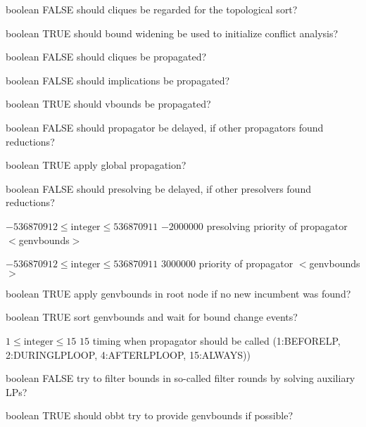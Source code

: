 %
{boolean}%
{FALSE}%
{should cliques be regarded for the topological sort?}%
{}

%
{boolean}%
{TRUE}%
{should bound widening be used to initialize conflict analysis?}%
{}

%
{boolean}%
{FALSE}%
{should cliques be propagated?}%
{}

%
{boolean}%
{FALSE}%
{should implications be propagated?}%
{}

%
{boolean}%
{TRUE}%
{should vbounds be propagated?}%
{}

%
{boolean}%
{FALSE}%
{should propagator be delayed, if other propagators found reductions?}%
{}

%
{boolean}%
{TRUE}%
{apply global propagation?}%
{}

%
{boolean}%
{FALSE}%
{should presolving be delayed, if other presolvers found reductions?}%
{}

%
{$-536870912\leq\textrm{integer}\leq536870911$}%
{$-2000000$}%
{presolving priority of propagator $<$genvbounds$>$}%
{}

%
{$-536870912\leq\textrm{integer}\leq536870911$}%
{$3000000$}%
{priority of propagator $<$genvbounds$>$}%
{}

%
{boolean}%
{TRUE}%
{apply genvbounds in root node if no new incumbent was found?}%
{}

%
{boolean}%
{TRUE}%
{sort genvbounds and wait for bound change events?}%
{}

%
{$1\leq\textrm{integer}\leq15$}%
{$15$}%
{timing when propagator should be called (1:BEFORELP, 2:DURINGLPLOOP, 4:AFTERLPLOOP, 15:ALWAYS))}%
{}

%
{boolean}%
{FALSE}%
{try to filter bounds in so-called filter rounds by solving auxiliary LPs?}%
{}

%
{boolean}%
{TRUE}%
{should obbt try to provide genvbounds if possible?}%
{}

